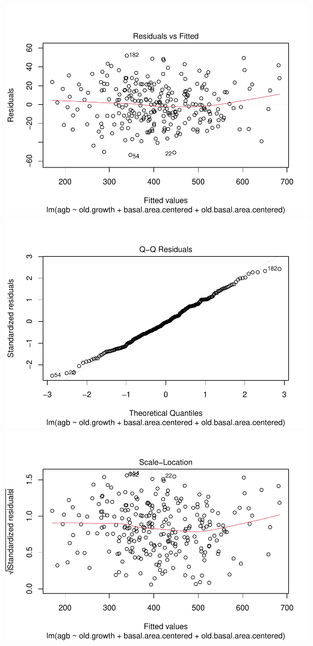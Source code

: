 \documentclass[
]{article}
\begin{document}
\includegraphics{Stats-Lab-7_files/figure-latex/unnamed-chunk-14-1.pdf}
\includegraphics{Stats-Lab-7_files/figure-latex/unnamed-chunk-14-2.pdf}
\includegraphics{Stats-Lab-7_files/figure-latex/unnamed-chunk-14-3.pdf}
\end{document}
